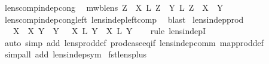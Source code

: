 \begin{isabellebody}
\isamarkupfalse%
%
\endisatagproof
{\isafoldproof}%
%
\isadelimproof
\isanewline
%
\endisadelimproof
\isanewline
{}\isamarkupfalse%
\ lens{\isacharunderscore}comp{\isacharunderscore}indep{\isacharunderscore}cong{\isacharcolon}\isanewline
\ \ {\isachardoublequoteopen}mwb{\isacharunderscore}lens\ Z\ {\isasymLongrightarrow}\ {\isacharparenleft}X\ {\isacharsemicolon}\isactrlsub L\ Z{\isacharparenright}\ {\isasymbowtie}\ {\isacharparenleft}Y\ {\isacharsemicolon}\isactrlsub L\ Z{\isacharparenright}\ {\isasymlongleftrightarrow}\ X\ {\isasymbowtie}\ Y{\isachardoublequoteclose}\isanewline
%
\isadelimproof
\ \ %
\endisadelimproof
%
\isatagproof
{}\isamarkupfalse%
\ lens{\isacharunderscore}comp{\isacharunderscore}indep{\isacharunderscore}cong{\isacharunderscore}left\ lens{\isacharunderscore}indep{\isacharunderscore}left{\isacharunderscore}comp\ \isamarkupfalse%
\ blast%
\endisatagproof
{\isafoldproof}%
%
\isadelimproof
\isanewline
%
\endisadelimproof
\isanewline
{}\isamarkupfalse%
\ lens{\isacharunderscore}indep{\isacharunderscore}prod{\isacharcolon}\isanewline
\ \ {\isachardoublequoteopen}{\isasymlbrakk}\ X\ {\isasymbowtie}\ X\ Y\ {\isasymbowtie}\ Y\ {\isasymrbrakk}\ {\isasymLongrightarrow}\ X\ {\isasymtimes}\isactrlsub L\ Y\ {\isasymbowtie}\ X\ {\isasymtimes}\isactrlsub L\ Y\isanewline
%
\isadelimproof
\ \ %
\endisadelimproof
%
\isatagproof
{}\isamarkupfalse%
\ {\isacharparenleft}rule\ lens{\isacharunderscore}indepI{\isacharparenright}\isanewline
\ \ \isamarkupfalse%
\ {\isacharparenleft}auto\ simp\ add{\isacharcolon}\ lens{\isacharunderscore}prod{\isacharunderscore}def\ prod{\isachardot}case{\isacharunderscore}eq{\isacharunderscore}if\ lens{\isacharunderscore}indep{\isacharunderscore}comm\ map{\isacharunderscore}prod{\isacharunderscore}def{\isacharparenright}\isanewline
\ \ \isamarkupfalse%
\ {\isacharparenleft}simp{\isacharunderscore}all\ add{\isacharcolon}\ lens{\isacharunderscore}indep{\isacharunderscore}sym{\isacharparenright}\isanewline
{}\isamarkupfalse%
%
\endisatagproof
{\isafoldproof}%
%
\isadelimproof
%
\endisadelimproof
%
\isamarkuptrue%
\isamarkupfalse%
\ fst{\isacharunderscore}lens{\isacharunderscore}plus{\isacharcolon}\isanewline

\end{isabellebody}
